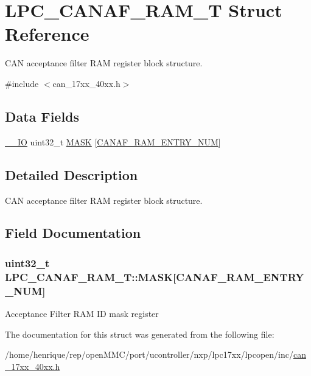 \hypertarget{structLPC__CANAF__RAM__T}{\section{L\-P\-C\-\_\-\-C\-A\-N\-A\-F\-\_\-\-R\-A\-M\-\_\-\-T Struct Reference}
\label{structLPC__CANAF__RAM__T}
}


C\-A\-N acceptance filter R\-A\-M register block structure.  




{\ttfamily \#include $<$can\-\_\-17xx\-\_\-40xx.\-h$>$}

\subsection*{Data Fields}
\begin{DoxyCompactItemize}
\item 
\hyperlink{core__cm3_8h_aec43007d9998a0a0e01faede4133d6be}{\-\_\-\-\_\-\-I\-O} uint32\-\_\-t \hyperlink{structLPC__CANAF__RAM__T_aca1f20422319eb6c80082ba9fd8cc3bc}{M\-A\-S\-K} \mbox{[}\hyperlink{group__CAN__17XX__40XX_ga79546dad61d5645789e339371e9f491f}{C\-A\-N\-A\-F\-\_\-\-R\-A\-M\-\_\-\-E\-N\-T\-R\-Y\-\_\-\-N\-U\-M}\mbox{]}
\end{DoxyCompactItemize}


\subsection{Detailed Description}
C\-A\-N acceptance filter R\-A\-M register block structure. 

\subsection{Field Documentation}
\hypertarget{structLPC__CANAF__RAM__T_aca1f20422319eb6c80082ba9fd8cc3bc}{
\subsubsection[{M\-A\-S\-K}]{ uint32\-\_\-t L\-P\-C\-\_\-\-C\-A\-N\-A\-F\-\_\-\-R\-A\-M\-\_\-\-T\-::\-M\-A\-S\-K\mbox{[}{\bf C\-A\-N\-A\-F\-\_\-\-R\-A\-M\-\_\-\-E\-N\-T\-R\-Y\-\_\-\-N\-U\-M}\mbox{]}}}\label{structLPC__CANAF__RAM__T_aca1f20422319eb6c80082ba9fd8cc3bc}
Acceptance Filter R\-A\-M I\-D mask register 

The documentation for this struct was generated from the following file\-:\begin{DoxyCompactItemize}
\item 
/home/henrique/rep/open\-M\-M\-C/port/ucontroller/nxp/lpc17xx/lpcopen/inc/\hyperlink{can__17xx__40xx_8h}{can\-\_\-17xx\-\_\-40xx.\-h}\end{DoxyCompactItemize}
